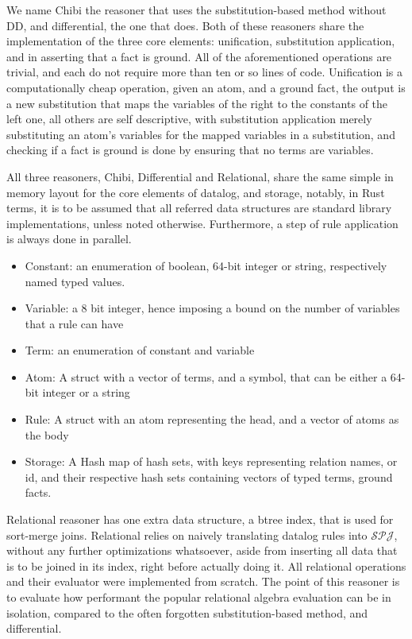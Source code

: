 \documentclass[sigconf,screen,review,natbib]{acmart}
\theoremstyle{definition}
\begin{document}
We name Chibi the reasoner that uses the substitution-based method without DD, and differential, the one
that does. Both of these reasoners share the implementation of the three core elements: unification, substitution application,
and in asserting that a fact is ground. All of the aforementioned operations are trivial, and each do not require more than
ten or so lines of code. Unification is a computationally cheap operation, given an atom, and a ground fact, the output is
a new substitution that maps the variables of the right to the constants of the left one, all others are self descriptive,
with substitution application merely substituting an atom's variables for the mapped variables in a substitution, and checking
if a fact is ground is done by ensuring that no terms are variables.

All three reasoners, Chibi, Differential and Relational, share the same simple in memory layout for the core elements of
datalog, and storage, notably, in Rust terms, it is to be assumed that all referred data structures are standard library
implementations, unless noted otherwise. Furthermore, a step of rule application is always done in parallel.
\begin{itemize}
	\item Constant: an enumeration of boolean, 64-bit integer or string, respectively named typed values.
	\item Variable: a 8 bit integer, hence imposing a bound on the number of variables that a rule can have
	\item Term: an enumeration of constant and variable
	\item Atom: A struct with a vector of terms, and a symbol, that can be either a 64-bit integer or a string
	\item Rule: A struct with an atom representing the head, and a vector of atoms as the body
	\item Storage: A Hash map of hash sets, with keys representing relation names, or id, and their respective
	      hash sets containing vectors of typed terms, ground facts.
\end{itemize}
Relational reasoner has one extra data structure, a btree index, that is used for sort-merge joins. Relational relies on
naively translating datalog rules into $\mathcal{SPJ}$, without any further optimizations whatsoever, aside from inserting
all data that is to be joined in its index, right before actually doing it. All relational operations and their evaluator
were implemented from scratch. The point of this reasoner is to evaluate how performant the popular relational algebra
evaluation can be in isolation, compared to the often forgotten substitution-based method, and differential.
\end{document}
